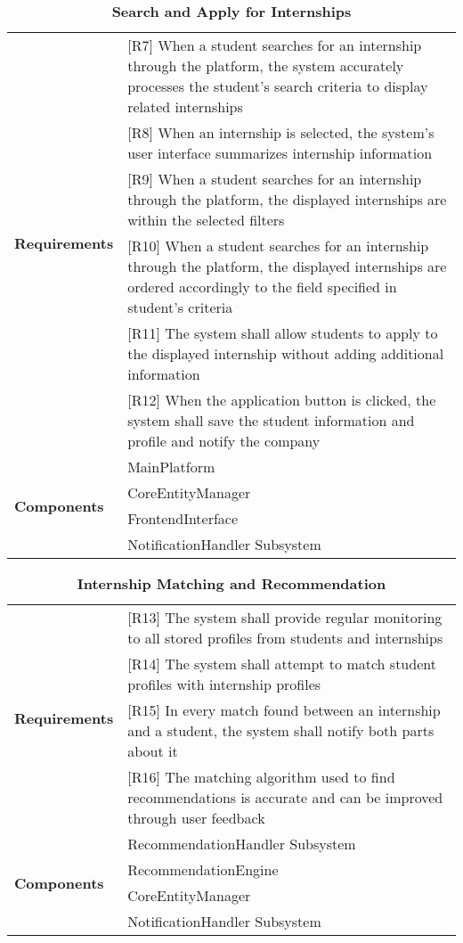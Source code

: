 \renewcommand{\arraystretch}{1.3}
\begin{longtable}{|p{}|p{}|}
\caption{\textbf{Search and Apply for Internships}} \\ \hline
\multirow{6}{*}{\textbf{Requirements}}
& [R7] When a student searches for an internship through the platform, the system accurately processes the student’s search criteria to display related internships \\
& [R8] When an internship is selected, the system’s user interface summarizes internship information \\
& [R9] When a student searches for an internship through the platform, the displayed internships are within the selected filters \\
& [R10] When a student searches for an internship through the platform, the displayed internships are ordered accordingly to the field specified in student's  criteria \\
& [R11] The system shall allow students to apply to the displayed internship without adding additional information \\
& [R12] When the application button is clicked, the system shall save the student information and profile and notify the company \\
\hline
\multirow{4}{*}{\textbf{Components}} 
& MainPlatform \\ 
& CoreEntityManager \\
& FrontendInterface \\ 
& NotificationHandler Subsystem\\
\hline
\end{longtable}


\renewcommand{\arraystretch}{1.3}
\begin{longtable}{|p{}|p{}|}
\caption{\textbf{Internship Matching and Recommendation}} \\ \hline
\multirow{4}{*}{\textbf{Requirements}}
& [R13] The system shall provide regular monitoring to all stored profiles from students and internships \\
& [R14] The system shall attempt to match student profiles with internship profiles \\
& [R15] In every match found between an internship and a student, the system shall notify both parts about it \\
& [R16] The matching algorithm used to find recommendations is accurate and can be improved through user feedback \\
\hline
\multirow{4}{*}{\textbf{Components}} 
& RecommendationHandler Subsystem\\
& RecommendationEngine \\
& CoreEntityManager \\
& NotificationHandler Subsystem\\
\hline
\end{longtable}


